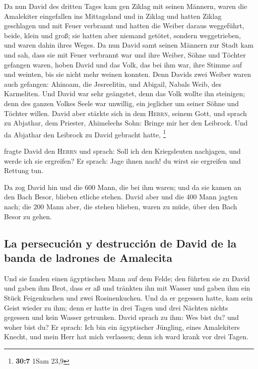  Da nun David des dritten Tages kam gen Ziklag mit seinen
Männern, waren die Amalekiter eingefallen ins Mittagsland und in Ziklag
und hatten Ziklag geschlagen und mit Feuer verbrannt  und
hatten die Weiber daraus weggeführt, beide, klein und groß; sie hatten
aber niemand getötet, sondern weggetrieben, und waren dahin ihres Weges.
 Da nun David samt seinen Männern zur Stadt kam und sah,
dass sie mit Feuer verbrannt war und ihre Weiber, Söhne und Töchter
gefangen waren,  hoben David und das Volk, das bei ihm
war, ihre Stimme auf und weinten, bis sie nicht mehr weinen konnten.
 Denn Davids zwei Weiber waren auch gefangen: Ahinoam, die
Jesreelitin, und Abigail, Nabals Weib, des Karmeliten. 
Und David war sehr geängstet, denn das Volk wollte ihn steinigen; denn
des ganzen Volkes Seele war unwillig, ein jeglicher um seiner Söhne und
Töchter willen. David aber stärkte sich in dem \textsc{Herrn}, seinem
Gott,  und sprach zu Abjathar, dem Priester, Ahimelechs
Sohn: Bringe mir her den Leibrock. Und da Abjathar den Leibrock zu David
gebracht hatte, \footnote{\textbf{30:7} 1Sam 23,9}

 fragte David den \textsc{Herrn} und sprach: Soll ich den
Kriegsleuten nachjagen, und werde ich sie ergreifen? Er sprach: Jage
ihnen nach! du wirst sie ergreifen und Rettung tun.

 Da zog David hin und die 600 Mann, die bei ihm waren; und
da sie kamen an den Bach Besor, blieben etliche stehen. 
David aber und die 400 Mann jagten nach; die 200 Mann aber, die stehen
blieben, waren zu müde, über den Bach Besor zu gehen.

\hypertarget{la-persecuciuxf3n-y-destrucciuxf3n-de-david-de-la-banda-de-ladrones-de-amalecita}{%
\subsection{La persecución y destrucción de David de la banda de
ladrones de
Amalecita}\label{la-persecuciuxf3n-y-destrucciuxf3n-de-david-de-la-banda-de-ladrones-de-amalecita}}

 Und sie fanden einen ägyptischen Mann auf dem Felde; den
führten sie zu David und gaben ihm Brot, dass er aß und tränkten ihn mit
Wasser  und gaben ihm ein Stück Feigenkuchen und zwei
Rosinenkuchen. Und da er gegessen hatte, kam sein Geist wieder zu ihm;
denn er hatte in drei Tagen und drei Nächten nichts gegessen und kein
Wasser getrunken.  David sprach zu ihm: Wes bist du? und
woher bist du? Er sprach: Ich bin ein ägyptischer Jüngling, eines
Amalekiters Knecht, und mein Herr hat mich verlassen; denn ich ward
krank vor drei Tagen.

